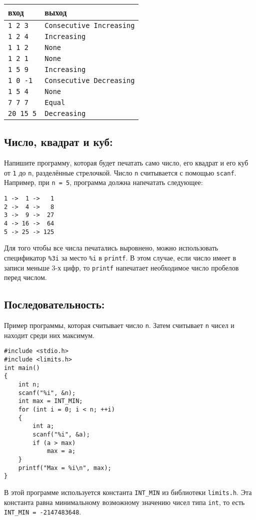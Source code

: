 \documentclass{article}
\begin{document}
\begin{center}
\begin{tabular}{ l l }
 вход & выход \\ \hline
 \texttt{1 2 3} & \texttt{Consecutive Increasing}  \\ 
 \texttt{1 2 4} & \texttt{Increasing}  \\
 \texttt{1 1 2} & \texttt{None} \\ 
 \texttt{1 2 1} & \texttt{None} \\ 
 \texttt{1 5 9} & \texttt{Increasing}  \\ 
 \texttt{1 0 -1} & \texttt{Consecutive Decreasing}  \\ 
 \texttt{1 5 4} & \texttt{None} \\ 
 \texttt{7 7 7} & \texttt{Equal} \\  
 \texttt{20 15 5} & \texttt{Decreasing} \\
\end{tabular}
\end{center}


\subsection{Число, квадрат и куб:} 
Напишите программу, которая будет печатать само число, его квадрат и его куб от \texttt{1} до \texttt{n}, разделённые стрелочкой.
Число \texttt{n} считывается с помощью \texttt{scanf}. 
Например, при \texttt{n = 5}, программа должна напечатать следующее:
\begin{verbatim}
1 ->  1 ->   1
2 ->  4 ->   8
3 ->  9 ->  27
4 -> 16 ->  64
5 -> 25 -> 125
\end{verbatim}
Для того чтобы все числа печатались выровнено, можно использовать спецификатор \texttt{\%3i} за место \texttt{\%i} в \texttt{printf}. В этом случае, если число имеет в записи меньше 3-х цифр, то \texttt{printf} напечатает необходимое число пробелов перед числом.



\subsection{Последовательность:} 
Пример программы, которая считывает число \texttt{n}. Затем считывает \texttt{n} чисел и находит среди них максимум. 

\begin{lstlisting}
#include <stdio.h>
#include <limits.h>
int main() 
{
    int n;
    scanf("%i", &n);
    int max = INT_MIN;
    for (int i = 0; i < n; ++i) 
    {
        int a;
        scanf("%i", &a);
        if (a > max)
            max = a;
    }
    printf("Max = %i\n", max);
}
\end{lstlisting}
В этой программе используется константа \texttt{INT\_MIN} из библиотеки \texttt{limits.h}. Эта константа равна минимальному возможному значению чисел типа \texttt{int}, то есть \texttt{INT\_MIN = -2147483648}.
\end{document}
